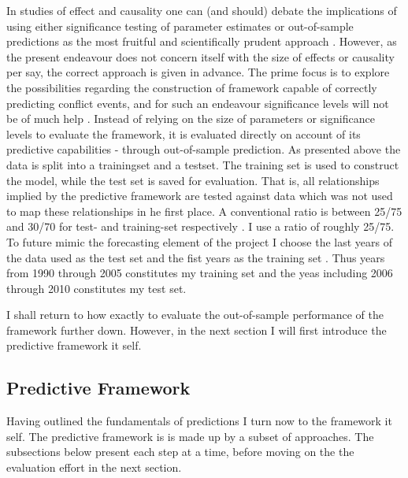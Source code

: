 \documentclass[a4paper]{article}
\begin{document}
In studies of effect and causality one can (and should) debate the implications of using either significance testing of parameter estimates or out-of-sample predictions as the most fruitful and scientifically prudent approach \citep{king_zeng_2001b, Goldstone_2010, Schrodt_2014}. However, as the present endeavour does not concern itself with the size of effects or causality per say, the correct approach is given in advance. The prime focus is to explore the possibilities regarding the construction of framework capable of correctly predicting conflict events, and for such an endeavour significance levels will not be of much help \citep{king_zeng_2001b, Ward_Greenhill_Bakke_2010, perry_2013, Schrodt_2014}. Instead of relying on the size of parameters or significance levels to evaluate the framework, it is evaluated directly on account of its predictive capabilities - through out-of-sample prediction. As presented above the data is split into a trainingset and a testset. The training set is used to construct the model, while the test set is saved for evaluation. That is, all relationships implied by the predictive framework are tested against data which was not used to map these relationships in he first place. A conventional ratio is between 25/75 and 30/70 for test- and training-set respectively \citep{Friedman_2001, Ward_Greenhill_Bakke_2010}. I use a ratio of roughly 25/75. To future mimic the forecasting element of the project I choose the last years of the data used as the test set and the fist years as the training set \citep{Goldstone_2010}. Thus years from 1990 through 2005 constitutes my training set and the yeas including 2006 through 2010 constitutes my test set.\par

I shall return to how exactly to evaluate the out-of-sample performance of the framework further down. However, in the next section I will first introduce the predictive framework it self.\par

\subsection{Predictive Framework}

Having outlined the fundamentals of predictions I turn now to the framework it self. The predictive framework is is made up by a subset of approaches. The subsections below present each step at a time, before moving on the the evaluation effort in the next section.\par
\end{document}
